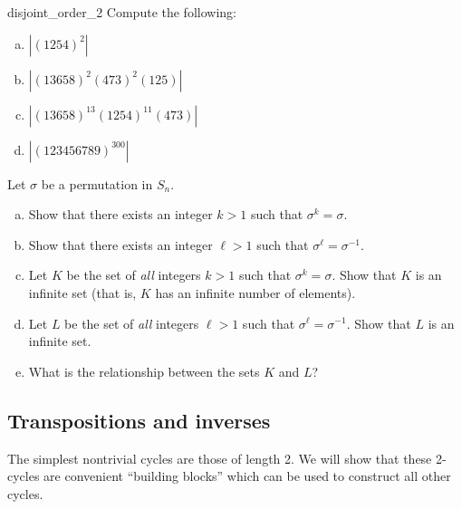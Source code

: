 \begin{exercise}{disjoint_order_2}
Compute the following:
\begin{multicols}{2}
\begin{enumerate}[(a)]
\item
$| (1 2 5 4)^2 |$ 
\item
$| (1 3 6 5 8)^2 (4 7 3)^2 (1 2 5) |$
\item
$| (1 3 6 5 8)^{13} (1 2 5 4)^{11} (4 7 3) |$
\item
$| (1 2  3 4 5 6 7 8 9)^{300} |$
\end{enumerate}
\end{multicols}
\end{exercise}



\begin{exercise}{}
Let $\sigma$ be a permutation in $S_n$.  
\begin{enumerate}[(a)]
\item
Show that there exists an integer $k>1$ such that $\sigma^k = \sigma$.
\item
Show that there exists an integer $\ell>1$ such that $\sigma^{\ell} = \sigma^{-1}$.
\item
Let $K$ be the set of \emph{all} integers $k>1$ such that $\sigma^k = \sigma$. Show that $K$ is an infinite set (that is, $K$ has an infinite number of elements).
\item
Let $L$ be the set of \emph{all} integers $\ell>1$ such that $\sigma^{\ell} = \sigma^{-1}$. Show that $L$ is an infinite set.
\item
What is the relationship between the sets $K$ and $L$?
\end{enumerate}
\end{exercise}


\subsection{Transpositions and inverses}
\label{subsec:Permutations:CycleAlgebraicProperties:TranspositionAndInverses}


The simplest  nontrivial cycles are those of length 2. We will show that these 2-cycles are convenient ``building blocks'' which can be used to construct all other cycles. 

